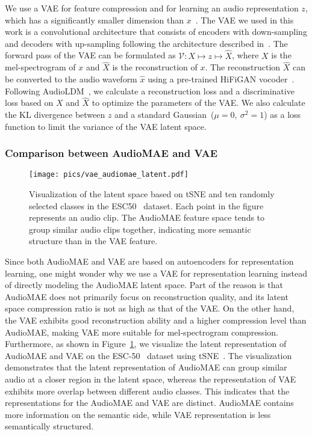 \documentclass[lettersize,journal]{IEEEtran}
\begin{document}
We use a VAE for feature compression and for learning an audio representation $z$, which has a significantly smaller dimension than $x$~\cite{liu2023audioldm}. The VAE we used in this work is a convolutional architecture that consists of encoders with down-sampling and decoders with up-sampling following the architecture described in~\cite{liu2023audioldm}. The forward pass of the VAE can be formulated as $\mathcal{V}: X\mapsto z\mapsto \hat{X}$, where $X$ is the mel-spectrogram of $x$ and $\hat{X}$ is the reconstruction of $x$. The reconstruction $\hat{X}$ can be converted to the audio waveform $\hat{x}$ using a pre-trained HiFiGAN vocoder~\cite{kong2020hifi}. Following AudioLDM~\cite{liu2023audioldm}, we calculate a reconstruction loss and a discriminative loss based on $X$ and $\hat{X}$ to optimize the parameters of the VAE. We also calculate the KL divergence between $z$ and a standard Gaussian~($\mu=0,~\sigma^{2}=1$) as a loss function to limit the variance of the VAE latent space.



\subsubsection{Comparison between AudioMAE and VAE} 

\begin{figure}
    \centering
    \texttt{[image: pics/vae\_audiomae\_latent.pdf]}
    \caption{Visualization of the latent space based on tSNE and ten randomly selected classes in the ESC50~\cite{piczak2015esc} dataset. Each point in the figure represents an audio clip. The AudioMAE feature space tends to group similar audio clips together, indicating more semantic structure than in the VAE feature.}
    \label{fig:tsne-comparison-visualization}
\end{figure}

Since both AudioMAE and VAE are based on autoencoders for representation learning, one might wonder why we use a VAE for representation learning instead of directly modeling the AudioMAE latent space.
Part of the reason is that AudioMAE does not primarily focus on reconstruction quality, and its latent space compression ratio is not as high as that of the VAE. On the other hand, the VAE exhibits good reconstruction ability and a higher compression level than AudioMAE, making VAE more suitable for mel-spectrogram compression.
Furthermore, as shown in Figure~\ref{fig:tsne-comparison-visualization}, we visualize the latent representation of AudioMAE and VAE on the ESC-50~\cite{piczak2015esc} dataset using tSNE~\cite{van2008visualizing-tsne}. The visualization demonstrates that the latent representation of AudioMAE can group similar audio at a closer region in the latent space, whereas the representation of VAE exhibits more overlap between different audio classes. This indicates that the representations for the AudioMAE and VAE are distinct. AudioMAE contains more information on the semantic side, while VAE representation is less semantically structured. 
\end{document}
